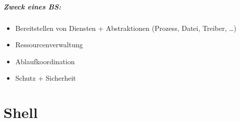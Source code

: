 \documentclass{scrreprt}
\begin{document}
\paragraph{Zweck eines BS:}
\begin{itemize}
\item Bereitstellen von Diensten + Abstraktionen (Prozess, Datei, Treiber, …)
\item Ressourcenverwaltung
\item Ablaufkoordination
\item Schutz + Sicherheit
\end{itemize}

\chapter{Shell}
\end{document}
